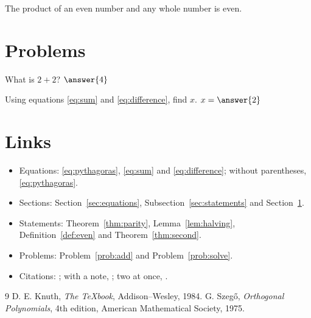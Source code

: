 \documentclass{ximera}
\begin{document}
\begin{theorem}\label{thm:second}
The product of an even number and any whole number is even.
\end{theorem}

\section{Problems}\label{sec:problems}

\begin{problem}\label{prob:add}
What is $2+2$? $\answer{4}$
\end{problem}

\begin{problem}\label{prob:solve}
Using equations \eqref{eq:sum} and \eqref{eq:difference}, find $x$.
$x = \answer{2}$
\end{problem}

\section{Links}

\begin{itemize}
\item Equations: \eqref{eq:pythagoras}, \eqref{eq:sum} and
  \eqref{eq:difference}; without parentheses, \ref{eq:pythagoras}.
\item Sections: Section~\ref{sec:equations}, Subsection~\ref{sec:statements}
  and Section~\ref{sec:problems}.
\item Statements: Theorem~\ref{thm:parity}, Lemma~\ref{lem:halving},
  Definition~\ref{def:even} and Theorem~\ref{thm:second}.
\item Problems: Problem~\ref{prob:add} and Problem~\ref{prob:solve}.
\item Citations: \cite{Szego}; with a note, \cite[Theorem 8.1.1]{Szego};
  two at once, \cite{Szego,Knuth}.
\end{itemize}

\begin{thebibliography}{9}
 D. E. Knuth, \emph{The \TeX book}, Addison--Wesley, 1984.
 G. Szeg\H{o}, \emph{Orthogonal Polynomials}, 4th edition,
  American Mathematical Society, 1975.
\end{thebibliography}
\end{document}
